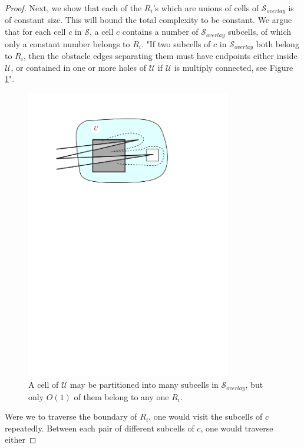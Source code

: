 \begin{proof}
Next, we show that each of the $R_i$'s which are unions of cells of $\mathcal{S}_{overlay}$ is of 
constant size. This will bound the total complexity to be constant. We argue that for each cell 
$c$ in $\mathcal{S}$, a cell $c$ contains a number of $\mathcal{S}_{overlay}$ subcells, of 
which only a constant number belongs to $R_i$. "If two subcells of $c$ in $\mathcal{S}_{overlay}$
both belong to $R_i$, then the obstacle edges separating them must have endpoints either inside 
$\mathcal{U}$, or contained in one or more holes of $\mathcal{U}$ if $\mathcal{U}$ is multiply 
connected, see Figure \ref{fig:partitionedcellofu}".

\begin{figure}[H]
	\centering
	\includegraphics[width=0.8\textwidth]{figures/upartitionedintosubcells.pdf}
	\caption{A cell of $\mathcal{U}$ may be partitioned into many subcells in 
    		 $\mathcal{S}_{overlay}$, but only $O(1)$ of them belong to any one $R_i$.
             \cite{HershbergerS99}}
	\label{fig:partitionedcellofu}
\end{figure}

Were we to traverse the boundary of $R_i$, one would visit the subcells of $c$ repeatedly. 
Between each pair of different subcells of $c$, one would traverse either


\end{proof}
